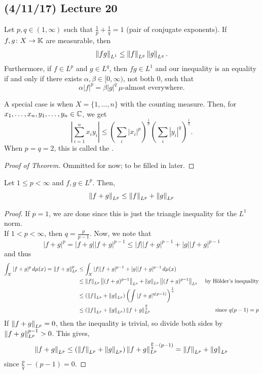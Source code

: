 \documentclass[11pt,leqno,oneside]{amsbook}
\numberwithin{thm}{section}
\newcommand{\K}{\mathbb{K}} %
\begin{document}
\subsection*{(4/11/17) Lecture 20}
\begin{thm}
  Let \(p,q \in (1,\infty)\) such that \(\frac{1}{p}+\frac{1}{q} = 1\)
  (pair of conjugate exponents). If \(f,g \from X \to \K\) are
  measurable, then \[
    \norm[fg]_{L^1} \leq \norm[f]_{L^p} \norm[g]_{L^q}.
  \]
  Furthermore, if \(f \in L^p\) and \(g \in L^q\), then \(fg \in L^1\)
  and our inequality is an equality if and only if there exists
  \(\alpha,\beta \in [0,\infty)\), not both 0, such that \[
    \alpha|f|^p = \beta |g|^q\ \mu\text{-almost everywhere.}
  \]
\end{thm}
\begin{rmk}
  A special case is when \(X = \{1,\ldots,n\}\) with the counting
  measure. Then, for \(x_1, \ldots, x_n, y_1, \ldots, y_n \in \C\), we
  get \[
    \left| \sum_{i=1}^n x_i y_i \right| \leq \left( \sum_i |x_i|^p
    \right)^\frac{1}{p} \left( \sum_i |y_i|^q\right)^\frac{1}{q}.
  \]
  When \(p=q=2\), this is called the .
\end{rmk}
\begin{proof}[Proof of Theorem]
  Ommitted for now; to be filled in later.
\end{proof}
\begin{thm}
  Let \(1 \leq p < \infty\) and \(f,g \in L^p\). Then, \[
    \norm[f+g]_{L^p} \leq \norm[f]_{L^p} + \norm[g]_{L^p}
  \]
\end{thm}
\begin{proof}
  If \(p=1\), we are done since this is just the triangle inequality
  for the \(L^1\) norm. \\

  If \(1 < p < \infty\), then \(q = \frac{p}{p-1}\). Now, we note
  that \[
    |f+g|^p = |f+g||f+g|^{p-1} \leq |f||f+g|^{p-1} + |g||f+g|^{p-1}
  \]
  and thus
  \begin{align*}
    \int_X |f+g|^p \d\mu(x) = \norm[f+g]_{L^p}^p
    & \leq \int_X |f||f+g|^{p-1} + |g||f+g|^{p-1} \d\mu(x) \\
    & \leq \norm[f]_{L^p} \norm[(f+g)^{p-1}]_{L^q} +
      \norm[g]_{L^p}\norm[(f+g)^{p-1}]_{L^q} & \text{ by H\"{o}lder's
                                               inequality} \\
    & \leq \left( \norm[f]_{L^p} + \norm[g]_{L^p} \right) \left( \int
      |f+g|^{q(p-1)} \right)^\frac{1}{q} \\
    & \leq \left( \norm[f]_{L^p} + \norm[g]_{L^p} \right)
      \norm[f+g]_{L^p}^\frac{p}{q} & \text{ since }q(p-1) = p
  \end{align*}
  If \(\norm[f+g]_{L^p} = 0\), then the inequality is trivial, so divide
  both sides by \(\norm[f+g]_{L^p}^{p-1} > 0\). This gives, \[
    \norm[f+g]_{L^p} \leq (\norm[f]_{L^p} + \norm[g]_{L^p})
    \norm[f+g]_{L^p}^{\frac{p}{q}-(p-1)} = \norm[f]_{L^p} + \norm[g]_{L^p}
  \]
  since \(\frac{p}{q}-(p-1) = 0\).
\end{proof}
\end{document}
